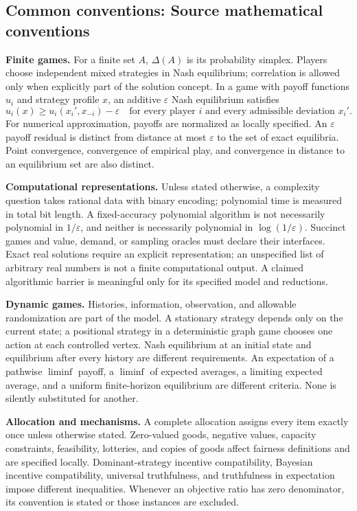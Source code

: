 \documentclass[11pt,a4paper]{article}
\begin{document}
\subsection*{Common conventions: Source mathematical conventions}

\textbf{Finite games.} For a finite set $A$, $\Delta(A)$ is its probability
simplex. Players choose independent mixed strategies in Nash equilibrium;
correlation is allowed only when explicitly part of the solution concept.
In a game with payoff functions $u_i$ and strategy profile $x$, an additive
$\varepsilon$ Nash equilibrium satisfies
\[
 u_i(x)\geq u_i(x_i',x_{-i})-\varepsilon
 \quad\text{for every player $i$ and every admissible deviation $x_i'$}.
\]
For numerical approximation, payoffs are normalized as locally specified.
An $\varepsilon$ payoff residual is distinct from distance at most
$\varepsilon$ to the set of exact equilibria. Point convergence, convergence
of empirical play, and convergence in distance to an equilibrium set are
also distinct.

\textbf{Computational representations.} Unless stated otherwise, a complexity
question takes rational data with binary encoding; polynomial time is measured
in total bit length. A fixed-accuracy polynomial algorithm is not necessarily
polynomial in $1/\varepsilon$, and neither is necessarily polynomial in
$\log(1/\varepsilon)$. Succinct games and value, demand, or sampling oracles
must declare their interfaces. Exact real solutions require an explicit
representation; an unspecified list of arbitrary real numbers is not a
finite computational output. A claimed algorithmic barrier is meaningful
only for its specified model and reductions.

\textbf{Dynamic games.} Histories, information, observation, and allowable
randomization are part of the model. A stationary strategy depends only on
the current state; a positional strategy in a deterministic graph game
chooses one action at each controlled vertex. Nash equilibrium at an initial
state and equilibrium after every history are different requirements.
An expectation of a pathwise $\liminf$ payoff, a $\liminf$ of expected averages,
a limiting expected average, and a uniform finite-horizon equilibrium are
different criteria. None is silently substituted for another.

\textbf{Allocation and mechanisms.} A complete allocation assigns every item
exactly once unless otherwise stated. Zero-valued goods, negative values,
capacity constraints, feasibility, lotteries, and copies of goods affect
fairness definitions and are specified locally. Dominant-strategy incentive
compatibility, Bayesian incentive compatibility, universal truthfulness,
and truthfulness in expectation impose different inequalities. Whenever
an objective ratio has zero denominator, its convention is stated or those
instances are excluded.
\end{document}

